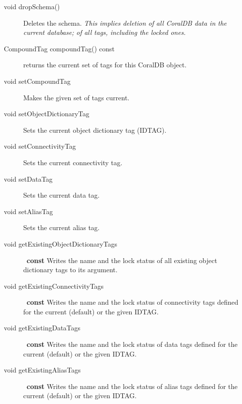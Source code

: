 \begin{description}
\item[void dropSchema()] Deletes the schema.  \emph{This implies
  deletion of all CoralDB data in the current database; of all tags,
  including the locked ones.}



\item[CompoundTag compoundTag() const] returns the current set of tags
  for this CoralDB object.

\item[void setCompoundTag]  Makes the
  given set of tags current.

\item[void setObjectDictionaryTag]
  Sets the current object dictionary tag (IDTAG).

\item[void setConnectivityTag]
  Sets the current connectivity tag.

\item[void setDataTag]
  Sets the current data tag.

\item[void setAliasTag]
  Sets the current alias tag.



\item[void getExistingObjectDictionaryTags]~\textbf{const} Writes the name and the lock status of all
  existing object dictionary tags to its argument.

\item[void getExistingConnectivityTags]~\textbf{const} 
  Writes the name and the lock status of connectivity tags defined for
  the current (default) or the given IDTAG.

\item[void getExistingDataTags]~\textbf{const}
  Writes the name and the lock status of data tags defined for
  the current (default) or the given IDTAG.
  

\item[void getExistingAliasTags]~\textbf{const}
  Writes the name and the lock status of alias tags defined for
  the current (default) or the given IDTAG.
   

\end{description}
